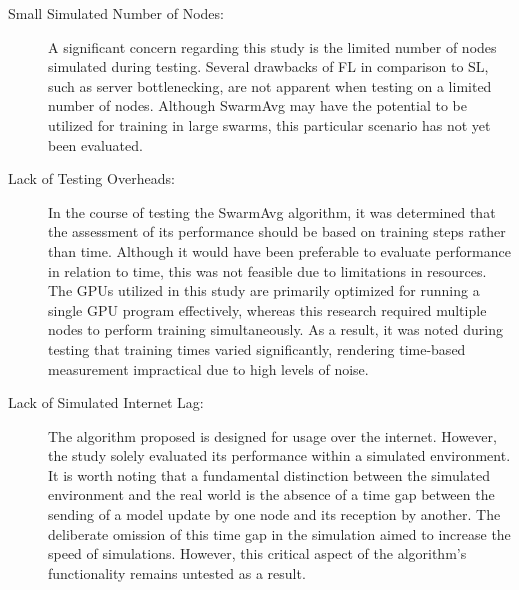 \begin{description}
	\item[Small Simulated Number of Nodes: ] A significant concern regarding this study is the limited number of nodes simulated during testing. Several drawbacks of FL in comparison to SL, such as server bottlenecking, are not apparent when testing on a limited number of nodes. Although SwarmAvg may have the potential to be utilized for training in large swarms, this particular scenario has not yet been evaluated.
	
	\item[Lack of Testing Overheads: ] In the course of testing the SwarmAvg algorithm, it was determined that the assessment of its performance should be based on training steps rather than time. Although it would have been preferable to evaluate performance in relation to time, this was not feasible due to limitations in resources. The GPUs utilized in this study are primarily optimized for running a single GPU program effectively, whereas this research required multiple nodes to perform training simultaneously. As a result, it was noted during testing that training times varied significantly, rendering time-based measurement impractical due to high levels of noise.
	
	\item[Lack of Simulated Internet Lag: ] The algorithm proposed is designed for usage over the internet. However, the study solely evaluated its performance within a simulated environment. It is worth noting that a fundamental distinction between the simulated environment and the real world is the absence of a time gap between the sending of a model update by one node and its reception by another. The deliberate omission of this time gap in the simulation aimed to increase the speed of simulations. However, this critical aspect of the algorithm's functionality remains untested as a result.
\end{description}